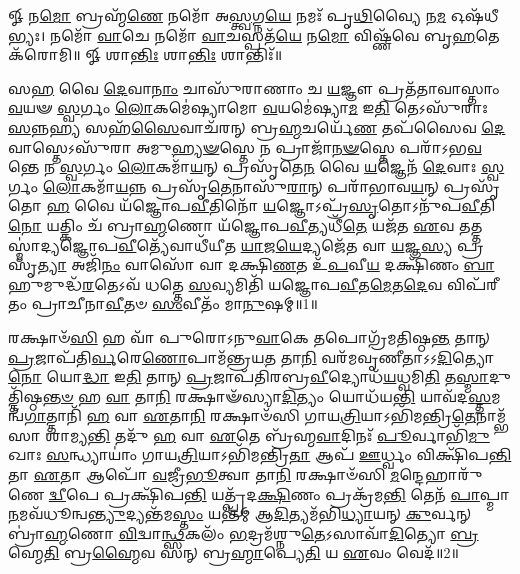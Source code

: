 
\setcounter{anuvakam}{0}
𑍐 𑌨\-\ul{𑌮𑍋} 𑌬𑍍𑌰𑌹𑍍𑌮᳴\-\ul{𑌣𑍇} 𑌨𑌮𑍋᳴ 𑌅\-\ul{𑌸𑍍𑌤𑍍𑌵}\-𑌗𑍍𑌨\-\ul{𑌯𑍇} 𑌨𑌮𑌃᳴ 𑌪𑍃\-\ul{𑌥𑌿}\-𑌵𑍍𑌯𑍈 𑌨\-\ul{𑌮} 𑌓𑌷᳴𑌧𑍀𑌭𑍍𑌯𑌃। 
𑌨𑌮𑍋᳴ \ul{𑌵𑌾}\-𑌚𑍇 𑌨𑌮𑍋᳴ \ul{𑌵𑌾}\-𑌚𑌸𑍍𑌪𑌤᳴\-\ul{𑌯𑍇} 𑌨\-\ul{𑌮𑍋} 𑌵𑌿𑌷𑍍𑌣᳴𑌵𑍇 𑌬𑍃\-\ul{𑌹}\-𑌤𑍇 𑌕᳴𑌰𑍋𑌮𑌿॥
𑍐 𑌶𑌾\-\ul{𑌨𑍍𑌤𑌿𑌃} 𑌶𑌾\-\ul{𑌨𑍍𑌤𑌿𑌃} 𑌶𑌾𑌨𑍍𑌤𑌿𑌃᳴॥

𑌸\-\ul{𑌹} 𑌵𑍈 \ul{𑌦𑍇}\-𑌵𑌾\-\ul{𑌨𑌾𑌂} 𑌚𑌾𑌸𑍁᳴𑌰𑌾𑌣𑌾𑌂 𑌚 \ul{𑌯}\-𑌜𑍍𑌞𑍗 𑌪𑍍𑌰𑌤᳴𑌤𑌾𑌵𑌾𑌸𑍍𑌤𑌾𑌂 \ul{𑌵}\-𑌯𑍟 \ul{𑌸𑍍𑌵}\-𑌰𑍍𑌗𑌂 \ul{𑌲𑍋}\-𑌕𑌮𑍇॑𑌷𑍍𑌯𑌾𑌮𑍋 \ul{𑌵}\-𑌯𑌮𑍇॑𑌷𑍍𑌯𑌾\-\ul{𑌮} 𑌇\-\ul{𑌤𑌿} 𑌤𑍇𑌽𑌸𑍁᳴𑌰𑌾𑌃 \ul{𑌸}\-𑌨𑍍𑌨\-\ul{𑌹𑍍𑌯} 𑌸𑌹᳴\-\ul{𑌸𑍈}\-𑌵𑌾𑌚᳴𑌰𑌨𑍍 𑌬𑍍𑌰\-\ul{𑌹𑍍𑌮}\-𑌚𑌰𑍍𑌯𑍇᳴\-\ul{𑌣} 𑌤𑌪᳴𑌸𑍈𑌵 \ul{𑌦𑍇}\-𑌵𑌾𑌸𑍍𑌤𑍇𑌽𑌸𑍁᳴𑌰𑌾 𑌅𑌮𑍁\-\ul{𑌹𑍍𑌯}\-\-\ul{𑍟}\-𑌸𑍍𑌤𑍇 𑌨 𑌪𑍍𑌰𑌾𑌜𑌾᳴\-\ul{𑌨}\-\-\ul{𑍟}\-𑌸𑍍𑌤𑍇 𑌪𑌰𑌾᳴𑌽𑌭\-\ul{𑌵}\-𑌨𑍍𑌤𑍇 𑌨 \ul{𑌸𑍍𑌵}\-𑌰𑍍𑌗𑌂 \ul{𑌲𑍋}\-𑌕𑌮𑌾᳴\-\ul{𑌯}\-𑌨𑍍 𑌪𑍍𑌰𑌸𑍃᳴𑌤𑍇\-\ul{𑌨} 𑌵𑍈 \ul{𑌯}\-𑌜𑍍𑌞𑍇𑌨᳴ \ul{𑌦𑍇}\-𑌵𑌾𑌃 \ul{𑌸𑍍𑌵}\-𑌰𑍍𑌗𑌂 \ul{𑌲𑍋}\-𑌕𑌮𑌾᳴\-\ul{𑌯}\-𑌨𑍍𑌨 𑌪𑍍𑌰𑌸𑍃᳴\-\ul{𑌤𑍇}\-𑌨𑌾𑌸𑍁᳴\-\ul{𑌰𑌾}\-𑌨𑍍 𑌪𑌰𑌾᳴𑌭𑌾𑌵\-\ul{𑌯}\-𑌨𑍍 𑌪𑍍𑌰𑌸𑍃᳴𑌤𑍋 \ul{𑌹} 𑌵𑍈 𑌯᳴𑌜𑍍𑌞𑍋𑌪\-\ul{𑌵𑍀}\-𑌤𑌿𑌨𑍋᳴ \ul{𑌯}\-𑌜𑍍𑌞𑍋𑌽𑌪𑍍𑌰᳴\-\ul{𑌸𑍃}\-𑌤𑍋𑌽𑌨𑍁᳴𑌪\-\ul{𑌵𑍀}\-𑌤𑌿\-\ul{𑌨𑍋} 𑌯𑌤𑍍𑌕𑌿𑌂 𑌚᳴ 𑌬𑍍𑌰𑌾\-\ul{𑌹𑍍𑌮}\-𑌣𑍋 𑌯᳴𑌜𑍍𑌞𑍋𑌪\-\ul{𑌵𑍀}\-𑌤𑍍𑌯𑌧𑍀᳴\-\ul{𑌤𑍇} 𑌯𑌜᳴𑌤 \ul{𑌏}\-𑌵 𑌤𑌤𑍍𑌤𑌸𑍍𑌮𑌾॑𑌦𑍍𑌯𑌜𑍍𑌞𑍋𑌪\-\ul{𑌵𑍀}\-𑌤𑍍𑌯𑍇᳴𑌵𑌾𑌧𑍀᳴𑌯𑍀𑌤 \ul{𑌯𑌾}\-𑌜\-\ul{𑌯𑍇}\-𑌦𑍍𑌯𑌜𑍇᳴𑌤 𑌵𑌾 \ul{𑌯}\-𑌜𑍍𑌞\-\ul{𑌸𑍍𑌯} 𑌪𑍍𑌰𑌸𑍃᳴\-\ul{𑌤𑍍𑌯𑌾} 𑌅𑌜𑌿᳴\-\ul{𑌨𑌂} 𑌵𑌾𑌸𑍋᳴ 𑌵𑌾 𑌦𑌕𑍍𑌷𑌿\-\ul{𑌣}\-𑌤 𑌉᳴\-\ul{𑌪}\-𑌵𑍀\-\ul{𑌯} 𑌦𑌕𑍍𑌷𑌿᳴𑌣𑌂 \ul{𑌬𑌾}\-𑌹𑍁𑌮𑍁𑌦𑍍𑌧᳴\-\ul{𑌰}\-𑌤𑍇𑌽𑌵᳴ 𑌧𑌤𑍍𑌤𑍇 \ul{𑌸}\-𑌵𑍍𑌯𑌮𑌿𑌤𑌿᳴ 𑌯𑌜𑍍𑌞𑍋𑌪\-\ul{𑌵𑍀}\-𑌤\-\ul{𑌮𑍇}\-𑌤\-\ul{𑌦𑍇}\-𑌵 𑌵𑌿𑌪᳴𑌰𑍀𑌤𑌂 𑌪𑍍𑌰𑌾𑌚𑍀𑌨𑌾\-\ul{𑌵𑍀}\-𑌤𑍞 \ul{𑌸𑌂}\-𑌵𑍀𑌤𑌂᳴ 𑌮𑌾\-\ul{𑌨𑍁}\-𑌷𑌮𑍍॥1॥\anuvakamend

𑌰𑌕𑍍𑌷𑌾𑍞᳴\-\ul{𑌸𑌿} 𑌹 𑌵𑌾᳴ 𑌪𑍁𑌰𑍋𑌽𑌨𑍁\-\ul{𑌵𑌾}\-𑌕𑍇 𑌤𑌪𑍋𑌗𑍍𑌰᳴𑌮𑌤𑌿𑌷𑍍𑌠\-\ul{𑌨𑍍𑌤} 𑌤𑌾𑌨𑍍 \ul{𑌪𑍍𑌰}\-𑌜𑌾𑌪᳴𑌤𑌿\-\ul{𑌰𑍍𑌵}\-𑌰𑍇\-\ul{𑌣𑍋}\-𑌪𑌾\-𑌮᳴𑌨𑍍𑌤𑍍𑌰𑌯\-\ul{𑌤} 𑌤𑌾\-\ul{𑌨𑌿} 𑌵𑌰᳴𑌮𑌵𑍃𑌣𑍀𑌤𑌾𑌽𑌽\-\ul{𑌦𑌿}\-𑌤𑍍𑌯𑍋 \ul{𑌨𑍋} 𑌯𑍋\-\ul{𑌦𑍍𑌧𑌾} 𑌇\-\ul{𑌤𑌿} 𑌤𑌾𑌨𑍍 \ul{𑌪𑍍𑌰}\-𑌜𑌾𑌪᳴𑌤𑌿𑌰𑌬𑍍𑌰\-\ul{𑌵𑍀}\-𑌦𑍍𑌯𑍋𑌧᳴\-\ul{𑌯}\-𑌧𑍍𑌵𑌮𑌿\-\ul{𑌤𑌿} 𑌤\-\ul{𑌸𑍍𑌮𑌾}\-𑌦𑍁𑌤𑍍𑌤𑌿᳴𑌷𑍍𑌠\-\ul{𑌨𑍍𑌤}\-\-\ul{𑍞} 𑌹 \ul{𑌵𑌾} 𑌤𑌾\-\ul{𑌨𑌿} 𑌰𑌕𑍍𑌷𑌾𑍟᳴𑌸𑍍𑌯𑌾\-\ul{𑌦𑌿}\-𑌤𑍍𑌯𑌂 𑌯𑍋𑌧᳴𑌯\-\ul{𑌨𑍍𑌤𑌿} 𑌯𑌾𑌵᳴𑌦\-\ul{𑌸𑍍𑌤}\-𑌮𑌨𑍍𑌵᳴\-\ul{𑌗𑌾}\-𑌤𑍍𑌤𑌾𑌨𑌿᳴ \ul{𑌹} 𑌵𑌾 \ul{𑌏}\-𑌤𑌾\-\ul{𑌨𑌿} 𑌰𑌕𑍍𑌷𑌾𑍞᳴𑌸𑌿 𑌗𑌾𑌯\-\ul{𑌤𑍍𑌰𑌿}\-𑌯𑌾\-𑌽𑌭𑌿᳴𑌮𑌨𑍍𑌤𑍍𑌰𑌿\-\ul{𑌤𑍇}\-𑌨𑌾𑌮𑍍𑌭᳴𑌸𑌾 𑌶𑌾𑌮𑍍𑌯\-\ul{𑌨𑍍𑌤𑌿} 𑌤𑌦𑍁᳴ \ul{𑌹} 𑌵𑌾 \ul{𑌏}\-𑌤𑍇 𑌬𑍍𑌰᳴𑌹𑍍𑌮\-\ul{𑌵𑌾}\-𑌦𑌿𑌨𑌃᳴ \ul{𑌪𑍂}\-𑌰𑍍𑌵𑌾𑌭𑌿᳴\-\ul{𑌮𑍁}\-𑌖𑌾𑌃 \ul{𑌸}\-𑌨𑍍𑌧𑍍𑌯𑌾𑌯𑌾𑌂॑ 𑌗𑌾𑌯\-\ul{𑌤𑍍𑌰𑌿}\-𑌯𑌾\-𑌽𑌭𑌿᳴𑌮𑌨𑍍𑌤𑍍𑌰𑌿\-\ul{𑌤𑌾} 𑌆𑌪᳴ \ul{𑌊}\-𑌰𑍍𑌧𑍍𑌵𑌂 𑌵𑌿𑌕𑍍𑌷𑌿᳴𑌪\-\ul{𑌨𑍍𑌤𑌿} 𑌤𑌾 \ul{𑌏}\-𑌤𑌾 𑌆𑌪𑍋᳴ \ul{𑌵}\-𑌜𑍍𑌰𑍀\-\ul{𑌭𑍂}\-𑌤𑍍𑌵𑌾 𑌤𑌾\-\ul{𑌨𑌿} 𑌰𑌕𑍍𑌷𑌾𑍞᳴𑌸𑌿 \ul{𑌮}\-𑌨𑍍𑌦𑍇𑌹𑌾𑌰𑍁᳴𑌣𑍇 \ul{𑌦𑍍𑌵𑍀}\-𑌪𑍇 𑌪𑍍𑌰𑌕𑍍𑌷𑌿᳴𑌪\-\ul{𑌨𑍍𑌤𑌿} 𑌯𑌤𑍍𑌪𑍍𑌰᳴𑌦\-\ul{𑌕𑍍𑌷𑌿}\-𑌣𑌂 𑌪𑍍𑌰𑌕𑍍𑌰᳴𑌮\-\ul{𑌨𑍍𑌤𑌿} 𑌤𑍇𑌨᳴ \ul{𑌪𑌾}\-𑌪𑍍𑌮𑌾\-\ul{𑌨}\-𑌮𑌵᳴𑌧𑍂𑌨𑍍𑌵\-\ul{𑌨𑍍𑌤𑍍𑌯𑍁}\-𑌦𑍍𑌯𑌨𑍍𑌤᳴𑌮\-\ul{𑌸𑍍𑌤𑌂} 𑌯𑌨𑍍𑌤᳴𑌮𑍍 𑌆\-\ul{𑌦𑌿}\-𑌤𑍍𑌯𑌮᳴𑌭𑌿\-\ul{𑌧𑍍𑌯𑌾}\-𑌯𑌨𑍍 \ul{𑌕𑍁}\-𑌰𑍍𑌵𑌨𑍍 𑌬𑍍𑌰𑌾॑\-\ul{𑌹𑍍𑌮}\-𑌣𑍋 \ul{𑌵𑌿}\-𑌦𑍍𑌵𑌾\-\ul{𑌨𑍍𑌥𑍍𑌸}\-𑌕𑌲𑌂᳴ \ul{𑌭}\-𑌦𑍍𑌰𑌮᳴𑌶𑍍𑌨𑍁\-\ul{𑌤𑍇}\-𑌽𑌸𑌾𑌵𑌾᳴\-\ul{𑌦𑌿}\-𑌤𑍍𑌯𑍋 \ul{𑌬𑍍𑌰}\-𑌹𑍍𑌮𑍇\-\ul{𑌤𑌿} 𑌬𑍍𑌰\-\ul{𑌹𑍍𑌮𑍈}\-𑌵 𑌸𑌨𑍍 𑌬𑍍𑌰\-\ul{𑌹𑍍𑌮𑌾}\-𑌪𑍍𑌯𑍇\-\ul{𑌤𑌿} 𑌯 \ul{𑌏}\-𑌵𑌂 𑌵𑍇𑌦᳴॥2॥\anuvakamend

